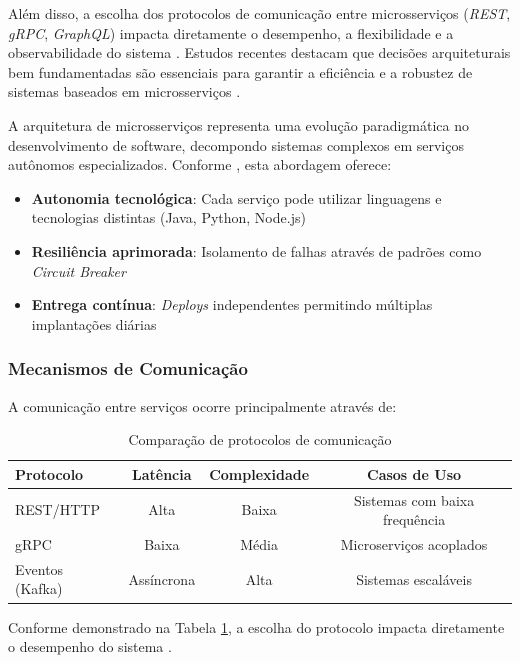 Além disso, a escolha dos protocolos de comunicação entre microsserviços (\textit{\gls{REST}}, \textit{\gls{gRPC}}, \textit{\gls{GraphQL}}) impacta diretamente o desempenho, a flexibilidade e a observabilidade do sistema \cite{niswar2023performance}. Estudos recentes destacam que decisões arquiteturais bem fundamentadas são essenciais para garantir a eficiência e a robustez de sistemas baseados em microsserviços \cite{niswar2023performance, sha2023automating}. 

A arquitetura de microsserviços representa uma evolução paradigmática no desenvolvimento de software, decompondo sistemas complexos em serviços autônomos especializados. Conforme \cite{jamshidi2016systematic}, esta abordagem oferece:

\begin{itemize}
    \item \textbf{Autonomia tecnológica}: Cada serviço pode utilizar linguagens e tecnologias distintas (Java, Python, Node.js)
    \item \textbf{Resiliência aprimorada}: Isolamento de falhas através de padrões como \textit{Circuit Breaker}
    \item \textbf{Entrega contínua}: \textit{Deploys} independentes permitindo múltiplas implantações diárias
\end{itemize}

\subsubsection{Mecanismos de Comunicação}
A comunicação entre serviços ocorre principalmente através de:

\begin{table}[h]
\centering
\caption{Comparação de protocolos de comunicação}
\begin{tabular}{|l|c|c|c|}
\hline
\textbf{Protocolo} & \textbf{Latência} & \textbf{Complexidade} & \textbf{Casos de Uso} \\
\hline
REST/HTTP & Alta & Baixa & Sistemas com baixa frequência \\
gRPC & Baixa & Média & Microserviços acoplados \\
Eventos (Kafka) & Assíncrona & Alta & Sistemas escaláveis \\
\hline
\end{tabular}
\label{tab:protocolos}
\end{table}

Conforme demonstrado na Tabela \ref{tab:protocolos}, a escolha do protocolo impacta diretamente o desempenho do sistema \cite{niswar2023performance}.

